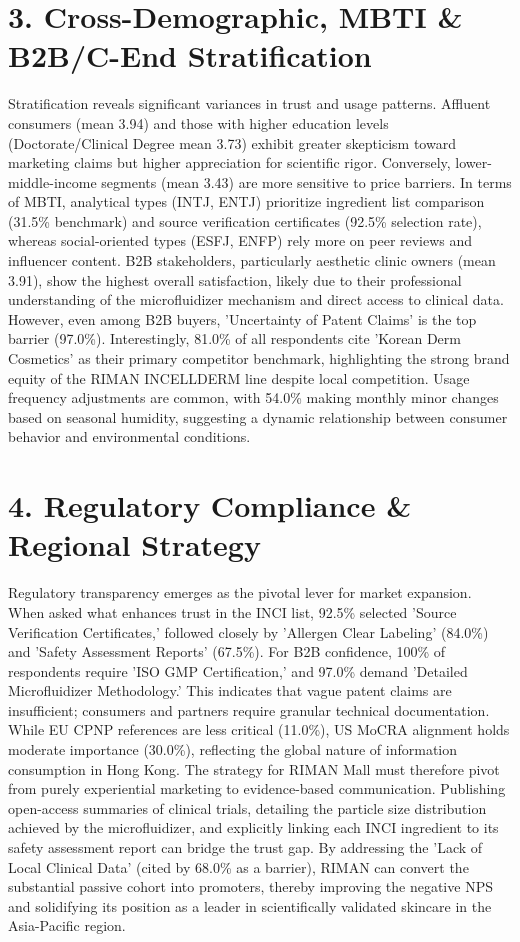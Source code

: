 \documentclass[10pt,twocolumn,a4paper]{article}
\begin{document}
\section{3. Cross-Demographic, MBTI \& B2B/C-End Stratification}
Stratification reveals significant variances in trust and usage patterns. Affluent consumers (mean 3.94) and those with higher education levels (Doctorate/Clinical Degree mean 3.73) exhibit greater skepticism toward marketing claims but higher appreciation for scientific rigor. Conversely, lower-middle-income segments (mean 3.43) are more sensitive to price barriers. In terms of MBTI, analytical types (INTJ, ENTJ) prioritize ingredient list comparison (31.5\% benchmark) and source verification certificates (92.5\% selection rate), whereas social-oriented types (ESFJ, ENFP) rely more on peer reviews and influencer content. B2B stakeholders, particularly aesthetic clinic owners (mean 3.91), show the highest overall satisfaction, likely due to their professional understanding of the microfluidizer mechanism and direct access to clinical data. However, even among B2B buyers, 'Uncertainty of Patent Claims' is the top barrier (97.0\%). Interestingly, 81.0\% of all respondents cite 'Korean Derm Cosmetics' as their primary competitor benchmark, highlighting the strong brand equity of the RIMAN INCELLDERM line despite local competition. Usage frequency adjustments are common, with 54.0\% making monthly minor changes based on seasonal humidity, suggesting a dynamic relationship between consumer behavior and environmental conditions.
\section{4. Regulatory Compliance \& Regional Strategy}
Regulatory transparency emerges as the pivotal lever for market expansion. When asked what enhances trust in the INCI list, 92.5\% selected 'Source Verification Certificates,' followed closely by 'Allergen Clear Labeling' (84.0\%) and 'Safety Assessment Reports' (67.5\%). For B2B confidence, 100\% of respondents require 'ISO GMP Certification,' and 97.0\% demand 'Detailed Microfluidizer Methodology.' This indicates that vague patent claims are insufficient; consumers and partners require granular technical documentation. While EU CPNP references are less critical (11.0\%), US MoCRA alignment holds moderate importance (30.0\%), reflecting the global nature of information consumption in Hong Kong. The strategy for RIMAN Mall must therefore pivot from purely experiential marketing to evidence-based communication. Publishing open-access summaries of clinical trials, detailing the particle size distribution achieved by the microfluidizer, and explicitly linking each INCI ingredient to its safety assessment report can bridge the trust gap. By addressing the 'Lack of Local Clinical Data' (cited by 68.0\% as a barrier), RIMAN can convert the substantial passive cohort into promoters, thereby improving the negative NPS and solidifying its position as a leader in scientifically validated skincare in the Asia-Pacific region.
\end{document}
